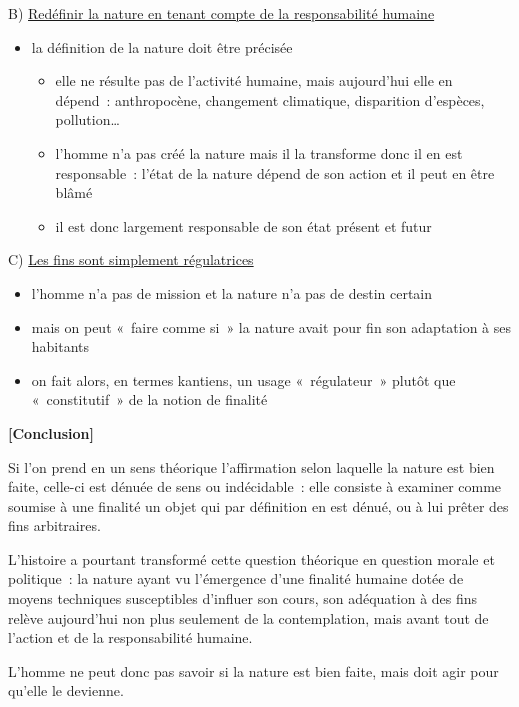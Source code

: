 \documentclass[a4paper,12pt]{report}
\begin{document}
\medskip

B) \uline{Redéfinir la nature en tenant compte de la responsabilité humaine}
\begin{itemize}
\item la définition de la nature doit être précisée
\begin{itemize}
\item elle ne résulte pas de l'activité humaine, mais aujourd'hui elle en
dépend : anthropocène, changement climatique, disparition d'espèces,
pollution\ldots{}
\item l'homme n'a pas créé la nature mais il la transforme donc il en est
responsable : l'état de la nature dépend de son action et il peut en
être blâmé
\item il est donc largement responsable de son état présent et futur
\end{itemize}
\end{itemize}

\medskip

C) \uline{Les fins sont simplement régulatrices}
\begin{itemize}
\item l'homme n'a pas de mission et la nature n'a pas de destin certain
\item mais on peut « faire comme si » la nature avait pour fin son
adaptation à ses habitants
\item on fait alors, en termes kantiens, un usage « régulateur » plutôt que
« constitutif » de la notion de finalité
\end{itemize}

\bigskip


\textbf{[Conclusion]}

Si l'on prend en un sens théorique
l'affirmation selon laquelle la nature est bien faite, celle-ci est
dénuée de sens ou indécidable : elle consiste à examiner comme soumise à
une finalité un objet qui par définition en est dénué, ou à lui prêter
des fins arbitraires.

L'histoire a pourtant transformé cette question théorique en question
morale et politique : la nature ayant vu l'émergence d'une finalité
humaine dotée de moyens techniques susceptibles d'influer son cours, son
adéquation à des fins relève aujourd'hui non plus seulement de la
contemplation, mais avant tout de l'action et de la responsabilité
humaine. 

L'homme ne peut donc pas savoir si la nature
est bien faite, mais doit agir pour qu'elle le devienne.
\end{document}
